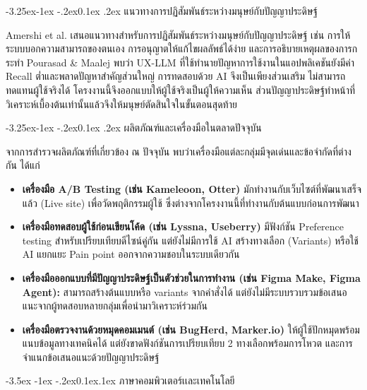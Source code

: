 \documentclass[a4paper,oneside]{cpe-thesis-th}
\makeatletter
\renewcommand\section{\@startsection{section}{1}{\z@}%
   {-3.5ex \@plus -1ex \@minus -.2ex}{0.1ex\@plus.1ex}%
   {\normalfont\thsz@section\bfseries}}
\renewcommand\subsection{\@startsection{subsection}{2}{\z@}%
   {-3.25ex\@plus -1ex \@minus -.2ex}{0.1ex \@plus .2ex}%
   {\normalfont\thsz@subsection\bfseries}}
\newcommand{\thaijustify}[1]{%
  \par\hspace{30pt}\justifying
  #1
}
\makeatother
\begin{document}
\subsection{แนวทางการปฏิสัมพันธ์ระหว่างมนุษย์กับปัญญาประดิษฐ์}
\thaijustify{
  Amershi et al. \cite{amershi2019} เสนอแนวทางสำหรับการปฏิสัมพันธ์ระหว่างมนุษย์กับปัญญาประดิษฐ์ เช่น การให้ระบบบอกความสามารถของตนเอง การอนุญาตให้แก้ไขผลลัพธ์ได้ง่าย และการอธิบายเหตุผลของการกระทำ Pourasad \& Maalej \cite{pourasad2025} พบว่า UX-LLM ที่ใช้ทำนายปัญหาการใช้งานในแอปพลิเคชันยังมีค่า Recall ต่ำและพลาดปัญหาสำคัญส่วนใหญ่ การทดสอบด้วย AI จึงเป็นเพียงส่วนเสริม ไม่สามารถทดแทนผู้ใช้จริงได้ โครงงานนี้จึงออกแบบให้ผู้ใช้จริงเป็นผู้ให้ความเห็น ส่วนปัญญาประดิษฐ์ทำหน้าที่วิเคราะห์เบื้องต้นเท่านั้นแล้วจึงให้มนุษย์ตัดสินใจในขั้นตอนสุดท้าย
}

\subsection{ผลิตภัณฑ์และเครื่องมือในตลาดปัจจุบัน}
\thaijustify{
  จากการสำรวจผลิตภัณฑ์ที่เกี่ยวข้อง ณ ปัจจุบัน พบว่าเครื่องมือแต่ละกลุ่มมีจุดเด่นและข้อจำกัดที่ต่างกัน ได้แก่
  \begin{itemize}
    \item \textbf{เครื่องมือ A/B Testing (เช่น Kameleoon, Otter)} มักทำงานกับเว็บไซต์ที่พัฒนาเสร็จแล้ว (Live site) เพื่อวัดพฤติกรรมผู้ใช้ ซึ่งต่างจากโครงงานนี้ที่ทำงานกับต้นแบบก่อนการพัฒนา \cite{kameleoon, otterab}
    \item \textbf{เครื่องมือทดสอบผู้ใช้ก่อนเขียนโค้ด (เช่น Lyssna, Useberry)} มีฟังก์ชัน Preference testing สำหรับเปรียบเทียบดีไซน์คู่กัน แต่ยังไม่มีการใช้ AI สร้างทางเลือก (Variants) หรือใช้ AI แยกแยะ Pain point ออกจากความชอบในระบบเดียวกัน \cite{lyssna, useberry}
    \item \textbf{เครื่องมือออกแบบที่มีปัญญาประดิษฐ์เป็นตัวช่วยในการทำงาน (เช่น Figma Make, Figma Agent):} สามารถสร้างต้นแบบหรือ variants จากคำสั่งได้ แต่ยังไม่มีระบบรวบรวมข้อเสนอแนะจากผู้ทดสอบหลายกลุ่มเพื่อนำมาวิเคราะห์ร่วมกัน \cite{figma_agent}
    \item \textbf{เครื่องมือตรวจงานด้วยหมุดคอมเมนต์ (เช่น BugHerd, Marker.io)} ให้ผู้ใช้ปักหมุดพร้อมแนบข้อมูลทางเทคนิคได้ แต่ยังขาดฟังก์ชันการเปรียบเทียบ 2 ทางเลือกพร้อมการโหวต และการจำแนกข้อเสนอแนะด้วยปัญญาประดิษฐ์ \cite{bugherd, markerio}
  \end{itemize}
}

\section{ภาษาคอมพิวเตอร์เเละเทคโนโลยี}
\end{document}
